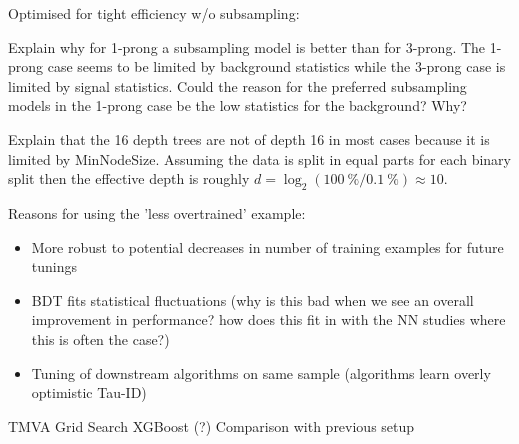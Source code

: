 Optimised for tight efficiency w/o subsampling:


Explain why for 1-prong a subsampling model is better than for 3-prong. The
1-prong case seems to be limited by background statistics while the 3-prong case
is limited by signal statistics. Could the reason for the preferred subsampling
models in the 1-prong case be the low statistics for the background? Why?

Explain that the 16 depth trees are not of depth 16 in most cases because it is
limited by MinNodeSize. Assuming the data is split in equal parts for each
binary split then the effective depth is roughly
$d = \log_2(\SI{100}{\percent} / \SI{0.1}{\percent}) \approx 10$.

Reasons for using the 'less overtrained' example:
\begin{itemize}
\item More robust to potential decreases in number of training examples for
  future tunings
\item BDT fits statistical fluctuations (why is this bad when we see an overall
  improvement in performance? how does this fit in with the NN studies where
  this is often the case?)
\item Tuning of downstream algorithms on same sample (algorithms learn overly
  optimistic Tau-ID)
\end{itemize}

TMVA Grid Search
XGBoost (?)
Comparison with previous setup

